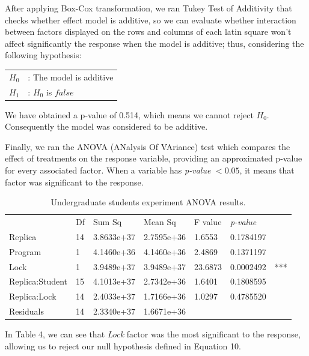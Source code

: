 After applying Box-Cox transformation, we ran Tukey Test of Additivity that checks whether effect model is additive, so we can evaluate whether interaction between factors displayed on the rows and columns of each latin square won't affect significantly the response when the model is additive; thus, considering the following hypothesis:

\begin{tabular}{ll}
$H_{0}$ & : The model is additive \\
$H_{1}$ & : $H_{0}$ is $false$ \\
\end{tabular}

We have obtained a p-value of 0.514, which means we cannot reject $H_{0}$. Consequently the model was considered to be additive.

Finally, we ran the ANOVA (ANalysis Of VAriance) test which compares the effect of treatments on the response variable, providing an approximated p-value for every associated factor. When a variable has \emph{p-value} $< 0.05$, it means that factor was significant to the response.

\begin{table}
\begin{center}
\caption{Undergraduate students experiment ANOVA results.}
\begin{tabular}{|l|l|l|l|l|ll|}
\hline
                & Df &    Sum Sq  &  Mean Sq   & F value & \emph{p-value} &     \\  
Replica         & 14 & 3.8633e+37 & 2.7595e+36 & 1.6553  & 0.1784197 &     \\   
Program         & 1  & 4.1460e+36 & 4.1460e+36 & 2.4869  & 0.1371197 &     \\   
Lock            & 1  & 3.9489e+37 & 3.9489e+37 & 23.6873 & 0.0002492 & *** \\
Replica:Student & 15 & 4.1013e+37 & 2.7342e+36 & 1.6401  & 0.1808595 &     \\  
Replica:Lock    & 14 & 2.4033e+37 & 1.7166e+36 & 1.0297  & 0.4785520 &     \\  
Residuals       & 14 & 2.3340e+37 & 1.6671e+36 &         &           &     \\
\hline
\end{tabular}
\end{center}
\end{table}

In Table 4, we can see that \emph{Lock} factor was the most significant to the response, allowing us to reject our null hypothesis defined in Equation 10.

